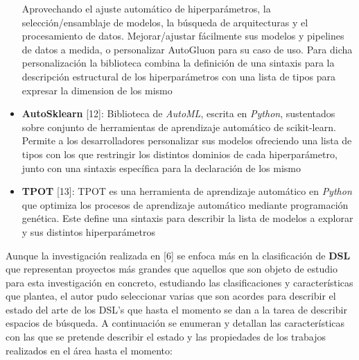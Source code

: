 \begin{itemize}
          Aprovechando el ajuste automático de hiperparámetros, la selección/ensamblaje de modelos,
          la búsqueda de arquitecturas y el procesamiento de datos. Mejorar/ajustar fácilmente sus
          modelos y pipelines de datos a medida, o personalizar AutoGluon para su caso de uso. Para
          dicha personalización la biblioteca combina la definición de una sintaxis para la descripción
          estructural de los hiperparámetros con una lista de tipos para expresar la dimension de los
          mismo
    \item {\bf AutoSklearn} [12]: Biblioteca de {\it AutoML}, escrita en {\it Python}, sustentados sobre
          conjunto de herramientas de aprendizaje automático de scikit-learn. Permite a los desarrolladores
          personalizar sus modelos ofreciendo una lista de tipos con los que restringir los distintos dominios
          de cada hiperparámetro, junto con una sintaxis específica para la declaración de los mismo
    \item {\bf TPOT} [13]: TPOT es una herramienta de aprendizaje automático en {\it Python} que optimiza los
          procesos de aprendizaje automático mediante programación genética. Este define una sintaxis para
          describir la lista de modelos a explorar y sus distintos hiperparámetros
\end{itemize}

Aunque la investigación realizada en [6] se enfoca más en la clasificación de {\bf DSL} que
representan proyectos más grandes que aquellos que son objeto de estudio para esta
investigación en concreto, estudiando las clasificaciones y características que plantea,
el autor pudo seleccionar varias que son acordes para describir el estado del arte
de los DSL's que hasta el momento se dan a la tarea de describir espacios de búsqueda.
A continuación se enumeran y detallan las características con las que se pretende
describir el estado y las propiedades de los trabajos realizados en el área hasta el
momento:

